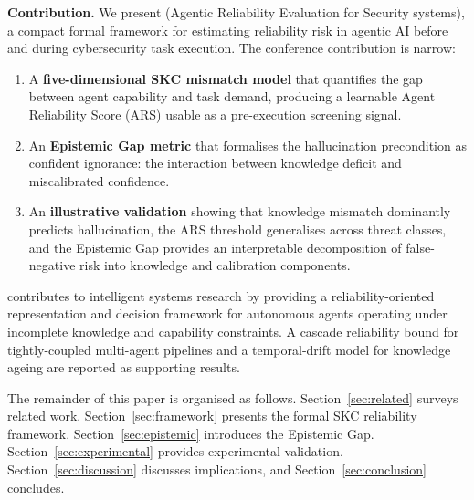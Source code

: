 \textbf{Contribution.}
We present \ARES{} (Agentic Reliability Evaluation for Security systems),
a compact formal framework for estimating reliability risk in agentic AI
before and during cybersecurity task execution. The conference contribution
is narrow:
\begin{enumerate}[noitemsep, leftmargin=*]
  \item A \textbf{five-dimensional SKC mismatch model} that quantifies the
    gap between agent capability and task demand, producing a learnable
    Agent Reliability Score (ARS) usable as a pre-execution screening
    signal.
  \item An \textbf{Epistemic Gap metric} that formalises the hallucination
    precondition as confident ignorance: the interaction between knowledge
    deficit and miscalibrated confidence.
  \item An \textbf{illustrative validation} showing that knowledge
    mismatch dominantly predicts hallucination, the ARS threshold
    generalises across threat classes, and the Epistemic Gap provides an
    interpretable decomposition of false-negative risk into knowledge
    and calibration components.
\end{enumerate}
\ARES{} contributes to intelligent systems research by providing a
reliability-oriented representation and decision framework for autonomous
agents operating under incomplete knowledge and capability constraints.
A cascade reliability bound for tightly-coupled multi-agent pipelines and
a temporal-drift model for knowledge ageing are reported as supporting
results.

The remainder of this paper is organised as follows. Section~\ref{sec:related}
surveys related work. Section~\ref{sec:framework} presents the formal SKC
reliability framework. Section~\ref{sec:epistemic} introduces the Epistemic
Gap. Section~\ref{sec:experimental} provides experimental validation.
Section~\ref{sec:discussion} discusses implications, and
Section~\ref{sec:conclusion} concludes.
